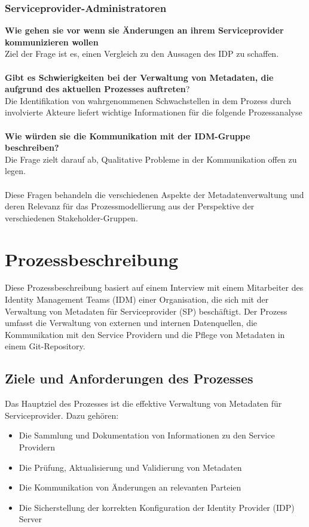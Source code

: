 \documentclass[a4paper, fontsize=11pt]{scrartcl}
\begin{document}
\subsubsection{Serviceprovider-Administratoren}
\textbf{Wie gehen sie vor wenn sie Änderungen an ihrem Serviceprovider kommunizieren wollen}\\
Ziel der Frage ist es, einen Vergleich zu den Aussagen des IDP zu schaffen.\\\\
\textbf{Gibt es Schwierigkeiten bei der Verwaltung von Metadaten, die aufgrund des aktuellen Prozesses auftreten}?\\
Die Identifikation von wahrgenommenen Schwachstellen in dem Prozess durch involvierte Akteure liefert wichtige Informationen für die folgende Prozessanalyse\\\\
\textbf{Wie würden sie die Kommunikation mit der IDM-Gruppe beschreiben?}\\
Die Frage zielt darauf ab, Qualitative Probleme in der Kommunikation offen zu legen.\\\\


Diese Fragen behandeln die verschiedenen Aspekte der Metadatenverwaltung und deren Relevanz für das Prozessmodellierung aus der Perspektive der verschiedenen Stakeholder-Gruppen.

\section{Prozessbeschreibung}

Diese Prozessbeschreibung basiert auf einem Interview mit einem Mitarbeiter des Identity Management Teams (IDM) einer Organisation, die sich mit der Verwaltung von Metadaten für Serviceprovider (SP) beschäftigt.
Der Prozess umfasst die Verwaltung von externen und internen Datenquellen, die Kommunikation mit den Service Providern und die Pflege von Metadaten in einem Git-Repository.

\subsection{Ziele und Anforderungen des Prozesses}

Das Hauptziel des Prozesses ist die effektive Verwaltung von Metadaten für Serviceprovider. Dazu gehören:

\begin{itemize}
  \item Die Sammlung und Dokumentation von Informationen zu den Service Providern
  \item Die Prüfung, Aktualisierung und Validierung von Metadaten
  \item Die Kommunikation von Änderungen an relevanten Parteien
  \item Die Sicherstellung der korrekten Konfiguration der Identity Provider (IDP) Server
\end{itemize}
\end{document}
